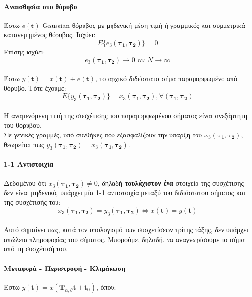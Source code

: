 \paragraph*{Αναισθησία στο θόρυβο}
Έστω $e(\boldsymbol{t})$ Gaussian θόρυβος με μηδενική μέση τιμή ή γραμμικός και συμμετρικά κατανεμημένος θόρυβος. Ισχύει:
\begin{equation}
E\lbrace e_3(\boldsymbol{\tau_1},\boldsymbol{\tau_2})\rbrace=0
\end{equation}
Επίσης ισχύει:
\begin{equation}
e_3(\boldsymbol{\tau_1},\boldsymbol{\tau_2}) \rightarrow 0 \textrm{ αν } N \rightarrow \infty
\end{equation}
\\Έστω $y(\textbf{t})= x(\textbf{t})+e(\textbf{t})$, το αρχικό διδιάστατο σήμα παραμορφωμένο από θόρυβο. Τότε έχουμε:
\begin{equation}
E \lbrace y_3(\boldsymbol{\tau_1},\boldsymbol{\tau_2}) \rbrace = x_3(\boldsymbol{\tau_1},\boldsymbol{\tau_2}), \forall (\boldsymbol{\tau_1},\boldsymbol{\tau_2})
\end{equation}
\\Η αναμενόμενη τιμή της συσχέτισης του παραμορφωμένου σήματος είναι ανεξάρτητη του θορύβου.\\
Σε γενικές γραμμές, υπό συνθήκες που εξασφαλίζουν την ύπαρξη του $x_3(\boldsymbol{\tau_1},\boldsymbol{\tau_2})$, θεωρείται πως $y_3(\boldsymbol{\tau_1},\boldsymbol{\tau_2}) = x_3(\boldsymbol{\tau_1},\boldsymbol{\tau_2})$.

\paragraph*{1-1 Αντιστοιχία}
Δεδομένου ότι $x_3(\boldsymbol{\tau_1},\boldsymbol{\tau_2})\neq 0$, δηλαδή \textbf{τουλάχιστον ένα} στοιχείο της συσχέτισης δεν είναι μηδενικό, υπάρχει μία 1-1 αντιστοιχία μεταξύ του διδιάστατου σήματος και της συσχέτισής του:
\begin{equation}
x_3(\boldsymbol{\tau_1},\boldsymbol{\tau_2}) = y_3(\boldsymbol{\tau_1},\boldsymbol{\tau_2}) \Leftrightarrow x(\textbf{t})=y(\textbf{t})
\end{equation}
\\Αυτό σημαίνει πως, κατά τον υπολογισμό των συσχετίσεων τρίτης τάξης, δεν υπάρχει απώλεια πληροφορίας του σήματος. Μπορούμε, δηλαδή, να αναγνωρίσουμε το σήμα από τη συσχέτισή του.

\paragraph*{Μεταφορά - Περιστροφή - Κλιμάκωση}
Έστω $y(\textbf{t}) = x(\textbf{T}_{\alpha,\theta}\textbf{t}+\textbf{t}_0)$, όπου:

